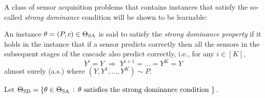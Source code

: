 A class of sensor acquisition problems that contains instances that satisfy the so-called \emph{strong dominance} condition 
will be shown to be learnable:
\begin{defi}
	An instance $\theta = (P,c)\in \Theta_{\mathrm{SA}}$  is said to satisfy the \emph{strong dominance property} if 
	it holds in the instance that if a sensor predicts correctly
	then all the sensors in the subsequent stages of the cascade also predict correctly, i.e., 
	for any $i\in [K]$,
	\begin{equation}
	\label{eqn:DominanceCondition}
	Y^i=Y \,\, \Rightarrow\,\, Y^{i+1}= \dots =  Y^K = Y
	\end{equation}
	almost surely (a.s.)
	where $(Y,Y^1,\dots,Y^K)\sim P$.
\end{defi}
Let $\Theta_{\mathrm{SD}} = \{ \theta\in \Theta_{\mathrm{SA}}\,:\, \theta \text{ satisfies the strong dominance condition } \}$.

